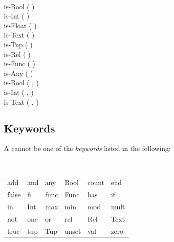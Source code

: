 \documentclass[a4,14pt,latin1]{article}
\begin{document}
{\begin{tabbing}
\\
\>\IS\>is-Bool (  )\OR \\
             \>   \>is-Int (  )\OR \\
             \>   \>is-Float (  )\OR \\
             \>   \>is-Text (  )\OR \\
             \>   \>is-Tup (  )\OR \\
             \>   \>is-Rel (  )\OR \\
             \>   \>is-Func (  )\OR \\
             \>   \>is-Any (  )\OR \\
             \>   \>is-Bool (  ,  )\OR \\
             \>   \>is-Int (  ,  )\OR \\
             \>   \>is-Text (  ,  ) \\
\end{tabbing}
}
\subsection{Keywords}
A  cannot be one of the {\em keywords\/} listed in the following:
{\tt
\begin{center}
\begin{tabular}{llllll}
add & and & any & Bool & count & end\\
false & fi & func & Func& has & if\\
in & Int & max & min & mod & mult \\
not & one & or & rel & Rel & Text \\
true & tup & Tup & unset & val & zero\\
\end{tabular}
\end{center}
}
\end{document}

